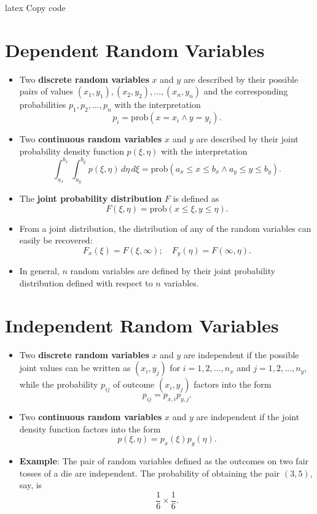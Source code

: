 latex
Copy code
\section{Dependent Random Variables}

\begin{itemize}[label=\textbullet]
    \item Two \textbf{discrete random variables} \( x \) and \( y \) are described by their possible pairs of values \( (x_1, y_1), (x_2, y_2), \ldots, (x_n, y_n) \) and the corresponding probabilities \( p_1, p_2, \ldots, p_n \) with the interpretation
    \[
    p_i = \text{prob}(x = x_i \land y = y_i).
    \]
    \item Two \textbf{continuous random variables} \( x \) and \( y \) are described by their joint probability density function \( p(\xi, \eta) \) with the interpretation
    \[
    \int_{a_x}^{b_x} \int_{a_y}^{b_y} p(\xi, \eta) \, d\eta \, d\xi = \text{prob}(a_x \leq x \leq b_x \land a_y \leq y \leq b_y).
    \]
\end{itemize}


\begin{itemize}[label=\textbullet]
    \item The \textbf{joint probability distribution} \( F \) is defined as
    \[
    F(\xi, \eta) = \text{prob}(x \leq \xi, y \leq \eta).
    \]
    \item From a joint distribution, the distribution of any of the random variables can easily be recovered:
    \[
    F_x(\xi) = F(\xi, \infty); \quad F_y(\eta) = F(\infty, \eta).
    \]
    \item In general, \( n \) random variables are defined by their joint probability distribution defined with respect to \( n \) variables.
\end{itemize}

\section{Independent Random Variables}

\begin{itemize}[label=\textbullet]
    \item Two \textbf{discrete random variables} \( x \) and \( y \) are independent if the possible joint values can be written as \( (x_i, y_j) \) for \( i = 1, 2, \ldots, n_x \) and \( j = 1, 2, \ldots, n_y \), while the probability \( p_{ij} \) of outcome \( (x_i, y_j) \) factors into the form
    \[
    p_{ij} = p_{x,i} p_{y,j}.
    \]
    \item Two \textbf{continuous random variables} \( x \) and \( y \) are independent if the joint density function factors into the form
    \[
    p(\xi, \eta) = p_x(\xi) p_y(\eta).
    \]
    \item \textbf{Example}: The pair of random variables defined as the outcomes on two fair tosses of a die are independent. The probability of obtaining the pair \((3, 5)\), say, is
    \[
    \frac{1}{6} \times \frac{1}{6}.
    \]
\end{itemize}

